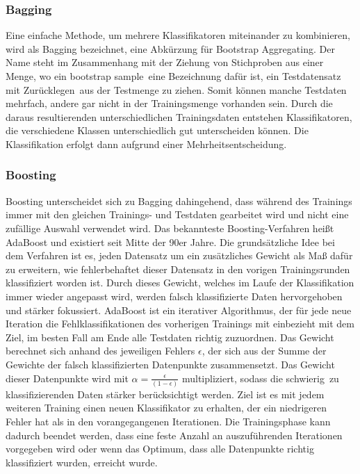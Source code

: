 \subsubsection*{Bagging}
Eine einfache Methode, um mehrere Klassifikatoren miteinander zu kombinieren, wird als Bagging bezeichnet, eine Abkürzung für Bootstrap Aggregating. Der Name steht im Zusammenhang mit der Ziehung von Stichproben aus einer Menge, wo ein \glqq bootstrap sample\grqq\ eine Bezeichnung dafür ist, ein Testdatensatz \glqq mit Zurücklegen\grqq\ aus der Testmenge zu ziehen. Somit können manche Testdaten mehrfach, andere gar nicht in der Trainingsmenge vorhanden sein. Durch die daraus resultierenden unterschiedlichen Trainingsdaten entstehen Klassifikatoren, die verschiedene Klassen unterschiedlich gut unterscheiden können. Die Klassifikation erfolgt dann aufgrund einer Mehrheitsentscheidung.

\subsubsection*{Boosting}
Boosting unterscheidet sich zu Bagging dahingehend, dass während des Trainings immer mit den gleichen Trainings- und Testdaten gearbeitet wird und nicht eine zufällige Auswahl verwendet wird.
Das bekannteste Boosting-Verfahren heißt AdaBoost und existiert seit Mitte der 90er Jahre. Die grundsätzliche Idee bei dem Verfahren ist es, jeden Datensatz um ein zusätzliches Gewicht als Maß dafür zu erweitern, wie fehlerbehaftet dieser Datensatz in den vorigen Trainingsrunden klassifiziert worden ist. Durch dieses Gewicht, welches im Laufe der Klassifikation immer wieder angepasst wird, werden falsch klassifizierte Daten hervorgehoben und stärker fokussiert. AdaBoost ist ein iterativer Algorithmus, der für jede neue Iteration die Fehlklassifikationen des vorherigen Trainings mit einbezieht mit dem Ziel, im besten Fall am Ende alle Testdaten richtig zuzuordnen. Das Gewicht berechnet sich anhand des jeweiligen Fehlers $\epsilon$, der sich aus der Summe der Gewichte der falsch klassifizierten Datenpunkte zusammensetzt. Das Gewicht dieser Datenpunkte wird mit
$ \alpha = \frac{\epsilon}{(1-\epsilon)} $ 
multipliziert, sodass die \glqq schwierig\grqq\ zu klassifizierenden Daten stärker berücksichtigt werden. Ziel ist es mit jedem weiteren Training einen neuen Klassifikator zu erhalten, der ein niedrigeren Fehler hat als in den vorangegangenen Iterationen. Die Trainingsphase kann dadurch beendet werden, dass eine feste Anzahl an auszuführenden Iterationen vorgegeben wird oder wenn das Optimum, dass alle Datenpunkte richtig klassifiziert wurden, erreicht wurde.

